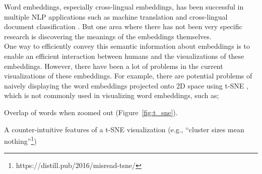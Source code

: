 Word embeddings, especially cross-lingual embeddings, has been successful in multiple NLP applications such as machine translation \cite{lample2018unsupervised, artetxe2018unsupervised} and cross-lingual document classification \cite{klementiev-titov-bhattarai:2012:PAPERS}. 
But one area where there has not been very specific research is discovering the meanings of the embeddings themselves. \\

One way to efficiently convey this semantic information about embeddings is to enable an efficient interaction between humans and the visualizations of these embeddings. However, there have been a lot of problems in the current visualizations of these embeddings.
For example, there are potential problems of naively displaying the word embeddings projected onto 2D space using t-SNE \cite{t-sne}, which is not commonly used in visualizing word embeddings, such as;
\begin{itemize*}
  \item Overlap of words when zoomed out (Figure~\ref{fig:t_sne}). 
  \item A counter-intuitive features of a t-SNE visualization (e.g., ``cluster sizes mean nothing''\footnote{https://distill.pub/2016/misread-tsne/}) 
\end{itemize*}

